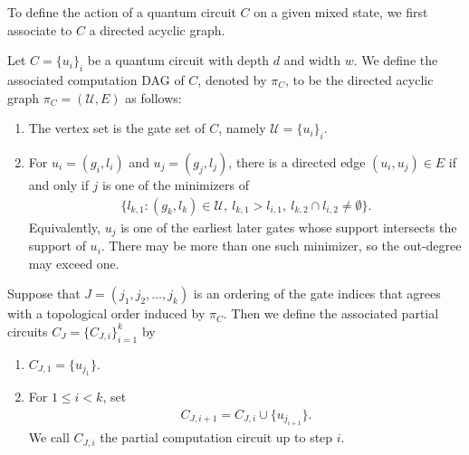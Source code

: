 To define the action of a quantum circuit $C$ on a given mixed state, we first associate to $C$ a directed acyclic graph.

\begin{definition}
  Let $C=\{u_i\}_i$ be a quantum circuit with depth $d$ and width $w$. We define the associated computation DAG of $C$, denoted by $\pi_C$, to be the directed acyclic graph $\pi_C=(\mathcal{U},E)$ as follows:
  \begin{enumerate}
    \item The vertex set is the gate set of $C$, namely $\mathcal{U}=\{u_i\}_i$.
    \item For $u_i=(g_i,l_i)$ and $u_j=(g_j,l_j)$, there is a directed edge $(u_i,u_j)\in E$ if and only if $j$ is one of the minimizers of
      \begin{equation*}
        \begin{split}
          \big\{ l_{k,1} : (g_k,l_k)\in \mathcal{U},\ l_{k,1}>l_{i,1},\ l_{k,2}\cap l_{i,2}\neq\emptyset \big\}.
        \end{split}
      \end{equation*}
      Equivalently, $u_j$ is one of the earliest later gates whose support intersects the support of $u_i$. There may be more than one such minimizer, so the out-degree may exceed one.
  \end{enumerate}

  Suppose that $J=(j_1,j_2,\ldots,j_k)$ is an ordering of the gate indices that agrees with a topological order induced by $\pi_C$. Then we define the associated partial circuits $C_J=\{C_{J,i}\}_{i=1}^{k}$ by
  \begin{enumerate}
    \item $C_{J,1}=\{u_{j_1}\}$.
    \item For $1\le i<k$, set
      \begin{equation*}
        \begin{split}
          C_{J,i+1}=C_{J,i}\cup\{u_{j_{i+1}}\}.
        \end{split}
      \end{equation*}
      We call $C_{J,i}$ the partial computation circuit up to step $i$.
  \end{enumerate}
\end{definition}

